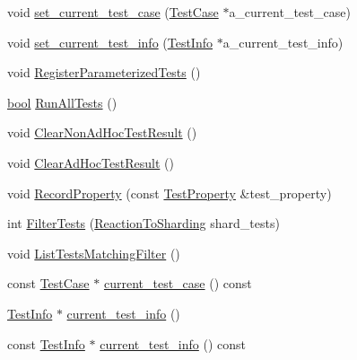 \begin{DoxyCompactItemize}
void \hyperlink{classtesting_1_1internal_1_1UnitTestImpl_a7f0e79bdabd28819cc857e316a36a350}{set\+\_\+current\+\_\+test\+\_\+case} (\hyperlink{classtesting_1_1TestCase}{Test\+Case} $\ast$a\+\_\+current\+\_\+test\+\_\+case)
\item 
void \hyperlink{classtesting_1_1internal_1_1UnitTestImpl_ab72211c99ce4427dfb472d6ecea62989}{set\+\_\+current\+\_\+test\+\_\+info} (\hyperlink{classtesting_1_1TestInfo}{Test\+Info} $\ast$a\+\_\+current\+\_\+test\+\_\+info)
\item 
void \hyperlink{classtesting_1_1internal_1_1UnitTestImpl_af84d2515f1a272a8783f00a3e8c0aff8}{Register\+Parameterized\+Tests} ()
\item 
\hyperlink{classbool}{bool} \hyperlink{classtesting_1_1internal_1_1UnitTestImpl_a1fb6be9971f4768c4136a05aa9e7e375}{Run\+All\+Tests} ()
\item 
void \hyperlink{classtesting_1_1internal_1_1UnitTestImpl_a96c2a5b23541ef01020c402644563ba1}{Clear\+Non\+Ad\+Hoc\+Test\+Result} ()
\item 
void \hyperlink{classtesting_1_1internal_1_1UnitTestImpl_ac44629cc4fa12b788779d4aa76939510}{Clear\+Ad\+Hoc\+Test\+Result} ()
\item 
void \hyperlink{classtesting_1_1internal_1_1UnitTestImpl_a15e4af4df167d2504decbc8fcc108a6f}{Record\+Property} (const \hyperlink{classtesting_1_1TestProperty}{Test\+Property} \&test\+\_\+property)
\item 
int \hyperlink{classtesting_1_1internal_1_1UnitTestImpl_abd47e447f0c2557ed528db0350671bed}{Filter\+Tests} (\hyperlink{classtesting_1_1internal_1_1UnitTestImpl_acc5ffd3f9bc2e87bb3dba4218f58af43}{Reaction\+To\+Sharding} shard\+\_\+tests)
\item 
void \hyperlink{classtesting_1_1internal_1_1UnitTestImpl_ad2cfedef41d3d29aad23c2c64214e6f3}{List\+Tests\+Matching\+Filter} ()
\item 
const \hyperlink{classtesting_1_1TestCase}{Test\+Case} $\ast$ \hyperlink{classtesting_1_1internal_1_1UnitTestImpl_ae1f98925197cf344a23a7400deeee4dc}{current\+\_\+test\+\_\+case} () const
\item 
\hyperlink{classtesting_1_1TestInfo}{Test\+Info} $\ast$ \hyperlink{classtesting_1_1internal_1_1UnitTestImpl_a8d303ebdcf5989e96d3ed96fb7255102}{current\+\_\+test\+\_\+info} ()
\item 
const \hyperlink{classtesting_1_1TestInfo}{Test\+Info} $\ast$ \hyperlink{classtesting_1_1internal_1_1UnitTestImpl_a5e4cc3139e60371bd7898033c9b1c56d}{current\+\_\+test\+\_\+info} () const
\item 

\end{DoxyCompactItemize}
